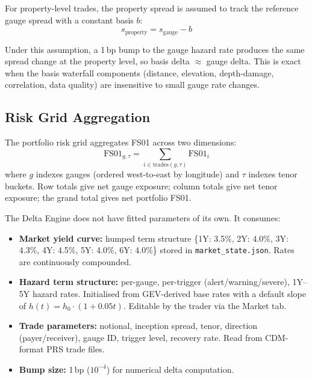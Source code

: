 \documentclass[11pt,a4paper]{article}
\begin{document}
For property-level trades, the property spread is assumed to track the reference gauge spread with a constant basis $b$:
\begin{equation}
    s_{\text{property}} = s_{\text{gauge}} - b
\end{equation}

Under this assumption, a 1\,bp bump to the gauge hazard rate produces the same spread change at the property level, so basis delta $\approx$ gauge delta. This is exact when the basis waterfall components (distance, elevation, depth-damage, correlation, data quality) are insensitive to small gauge rate changes.

\subsection{Risk Grid Aggregation}

The portfolio risk grid aggregates FS01 across two dimensions:
\begin{equation}
    \text{FS01}_{g,\tau} = \sum_{i \in \text{trades}(g,\tau)} \text{FS01}_i
\end{equation}
where $g$ indexes gauges (ordered west-to-east by longitude) and $\tau$ indexes tenor buckets. Row totals give net gauge exposure; column totals give net tenor exposure; the grand total gives net portfolio FS01.

\clearpage

\mkminputs

The Delta Engine does not have fitted parameters of its own. It consumes:

\begin{itemize}
    \item \textbf{Market yield curve:} humped term structure \{1Y: 3.5\%, 2Y: 4.0\%, 3Y: 4.3\%, 4Y: 4.5\%, 5Y: 4.0\%, 6Y: 4.0\%\} stored in \texttt{market\_state.json}. Rates are continuously compounded.
    \item \textbf{Hazard term structure:} per-gauge, per-trigger (alert/warning/severe), 1Y--5Y hazard rates. Initialised from GEV-derived base rates with a default slope of $h(t) = h_0 \cdot (1 + 0.05t)$. Editable by the trader via the Market tab.
    \item \textbf{Trade parameters:} notional, inception spread, tenor, direction (payer/receiver), gauge ID, trigger level, recovery rate. Read from CDM-format PRS trade files.
    \item \textbf{Bump size:} 1\,bp ($10^{-4}$) for numerical delta computation.
\end{itemize}
\end{document}
